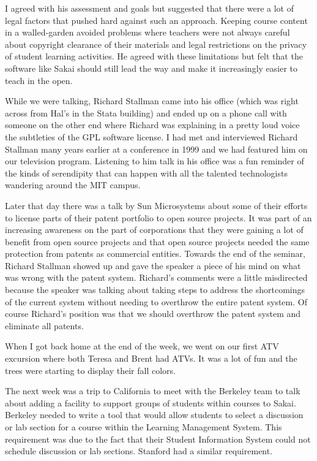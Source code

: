 \documentclass[12pt]{book}
\begin{document}
I
agreed with his assessment and goals but suggested
that there were a lot of legal factors that pushed hard
against such an approach.  Keeping course content
in a walled-garden avoided problems where teachers
were not always careful about copyright clearance
of their materials and legal restrictions on
the privacy of student learning
activities.  He agreed with these limitations but
felt that the software like Sakai should still
lead the way and make it increasingly easier to teach in
the open.

While we were talking, Richard Stallman came into his
office (which was right across from Hal's in the Stata
building) and ended up on a phone call with someone
on the other end where Richard was explaining in
a pretty loud voice the subtleties of the GPL software
license.  I had met and interviewed Richard Stallman
many years earlier at a conference in 1999 and we had
featured him on our television program.  Listening
to him talk in his office was a fun reminder of the kinds
of serendipity that can happen with all the talented
technologists wandering around the MIT campus.

Later that day there was a talk by Sun Microsystems
about some of their efforts to license parts of their
patent portfolio to open source projects.  It was
part of an increasing awareness on the part of
corporations that they were gaining a lot of benefit
from open source projects and that open source
projects needed the same protection from patents
as commercial entities.   Towards the end
of the seminar, Richard Stallman showed up and gave
the speaker a piece of his mind on what was wrong
with the patent system. Richard's comments were a little
misdirected because the speaker was talking about
taking steps to address the shortcomings of the current
system without needing to overthrow the entire patent
system.  Of course Richard's position was that we should
overthrow the patent system and eliminate all patents.

When I got back home at the end of the week, we went
on our first ATV excursion where both Teresa and Brent
had ATVs.  It was a lot of fun and
the trees were starting to display their fall colors.

The next week was a trip to California to meet with
the Berkeley team to talk about adding
a facility to support groups of students
within courses to Sakai.
Berkeley needed to write a tool that would
allow students to select a discussion or lab section
for a course within the Learning Management System.
This requirement was due to the fact that their
Student Information System could not schedule
discussion or lab sections.  Stanford had a similar
requirement.
\end{document}
